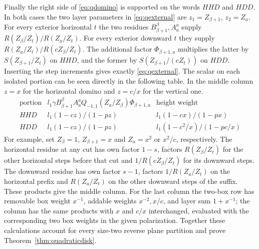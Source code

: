 Finally the right side of \eqref{eq:qdomino} is supported on the words
$HHD$ and $HDD$. In both cases the two layer parameters in
\eqref{eq:qexternal} are $z_1=Z_{\beta+1}$, $z_2=Z_a$.
For every exterior horizontal $t$ the two residues
$B_{\beta+1}^\beta,A_a^a$ supply $R(Z_\beta/Z_t)/R(Z_a/Z_t)$.
For every exterior downward $t$ they supply $R(Z_a/Z_t)/R(cZ_\beta/Z_t)$.
The additional factor $\Phi_{\beta+1,a}$ multiplies the latter by
$S(Z_{\beta+1}/Z_t)$ on $HHD$, and the former by
$S(Z_{\beta+1}/(cZ_t))$ on $HDD$. Inserting the step increments gives
exactly \eqref{eq:qexternal}. The scalar on each isolated portion can
be seen directly in the following table. In the middle column $z=x$
for the horizontal domino and $z=c/x$ for the vertical one.
\[
\begin{array}{c|c|c}
 \text{portion}&l_1\gamma B_{\beta+1}^\beta A_a^a
       Q_{-1,1}(Z_a/Z_\beta)\Phi_{\beta+1,a}
       &\text{height weight}\\ \hline
 HHD&l_1(1-cz)/(1-pz)&l_1(1-cx)/(1-px)\\
 HDD&l_1(1-cz)/(1-pz)&l_1(1-c^2/x)/(1-pc/x)
\end{array}
\]
For example, set $Z_\beta=1$, $Z_{\beta+1}=x$ and
$Z_a=x^2$ or $x^2/c$, respectively. The horizontal residue at any cut
has own factor $1-s$, factors $R(Z_\beta/Z_t)$ for the other
horizontal steps before that cut and $1/R(cZ_\beta/Z_t)$ for its
downward steps. The downward residue has own factor $s-1$, factors
$1/R(Z_a/Z_t)$ on the horizontal prefix and $R(Z_a/Z_t)$ on the other
downward steps of the suffix. These products give the middle column.
For the last column the two-box row has removable box weight $x^{-1}$,
addable weights $x^{-2},x/c$, and layer sum $1+x^{-1}$; the column
has the same products with $x$ and $c/x$ interchanged, evaluated with
the corresponding two box weights in the given polarization.
Together these calculations account for every size-two reverse plane
partition and prove Theorem~\ref{thm:quadraticdisk}.
